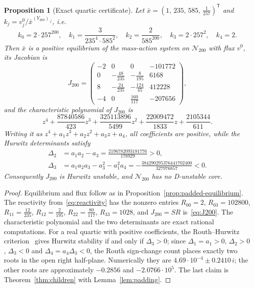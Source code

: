\documentclass[11pt,a4paper]{article}
\theoremstyle{plain}
\newtheorem{proposition}[theorem]{Proposition}
\theoremstyle{definition}
\theoremstyle{remark}
\newcommand{\xbar}{\bar{x}}
\begin{document}
\begin{proposition}[Exact quartic certificate]\label{prop:y200}
Let $\xbar=(1,\,235,\,585,\,\tfrac1{257})^{\mathsf T}$ and $k_j=v^0_j/\xbar^{(Y_{200})_{\cdot j}}$, i.e.
\[
  k_0=2\cdot257^{200},\quad k_1=\frac{3}{235^4\cdot585^2},\quad k_2=\frac{2}{585^{200}},\quad k_3=2\cdot257^2,\quad k_4=2 .
\]
Then $\xbar$ is a positive equilibrium of the mass-action system on $\mathcal N_{200}$ with flux $v^0$, its Jacobian is
\begin{equation}\label{eq:J200}
  J_{200}=\begin{pmatrix}-2&0&0&-101772\\[1pt]0&-\frac{48}{235}&-\frac{8}{195}&6168\\[1pt]8&-\frac{24}{235}&-\frac{124}{45}&412228\\[1pt]-4&0&\frac{160}{117}&-207656\end{pmatrix},
\end{equation}
and the characteristic polynomial of $J_{200}$ is
\begin{equation}\label{eq:quartic}
  z^4+\frac{87840586}{423}z^3+\frac{325113896}{5499}z^2+\frac{22009472}{1833}z+\frac{2105344}{611} .
\end{equation}
Writing it as $z^4+a_1z^3+a_2z^2+a_3z+a_4$, all coefficients are positive, while the Hurwitz determinants satisfy
\begin{equation}\label{eq:hurwitz200}
\begin{aligned}
  \Delta_2&=a_1a_2-a_3=\frac{2196782093181776}{178929}>0,\\
  \Delta_3&=a_1a_2a_3-a_3^2-a_1^2a_4=-\frac{384290295376441702400}{327976857}<0 .
\end{aligned}
\end{equation}
Consequently $J_{200}$ is Hurwitz unstable, and $\mathcal N_{200}$ has no D-unstable core.
\end{proposition}

\begin{proof}
Equilibrium and flux follow as in Proposition~\ref{prop:padded-equilibrium}. The reactivity from~\eqref{eq:reactivity} has the nonzero entries $R_{00}=2$, $R_{03}=102800$, $R_{11}=\frac{12}{235}$, $R_{12}=\frac{2}{195}$, $R_{22}=\frac{80}{117}$, $R_{33}=1028$, and $J_{200}=SR$ is~\eqref{eq:J200}. The characteristic polynomial and the two determinants are exact rational computations. For a real quartic with positive coefficients, the Routh--Hurwitz criterion~\cite[Ch.~XV]{Gantmacher1959} gives Hurwitz stability if and only if $\Delta_3>0$; since $\Delta_1=a_1>0$, $\Delta_2>0$, $\Delta_3<0$ and $\Delta_4=a_4\Delta_3<0$, the Routh sign-change count places exactly two roots in the open right half-plane. Numerically they are $4.69\cdot10^{-4}\pm0.2410\,i$; the other roots are approximately $-0.2856$ and $-2.0766\cdot10^{5}$. The last claim is Theorem~\ref{thm:children} with Lemma~\ref{lem:padding}.
\end{proof}
\end{document}
